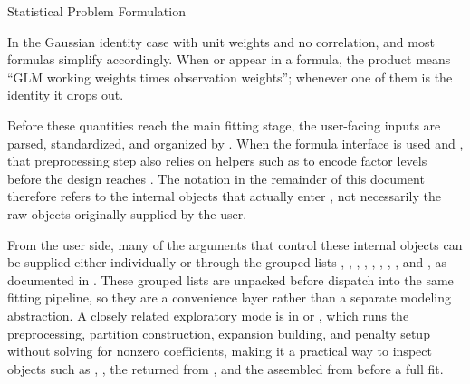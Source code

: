 \begin{Section}{Statistical Problem Formulation}
\begin{itemize}
\end{itemize}


In the Gaussian identity case with unit weights and no correlation,
and most formulas simplify accordingly. When  or
 appear in a formula, the product 
means ``GLM working weights times observation weights''; whenever one of
them is the identity it drops out.

Before these quantities reach the main fitting stage, the user-facing inputs
are parsed, standardized, and organized by . When
the formula interface is used and , that
preprocessing step also relies on helpers such as 
to encode factor levels before the design reaches .
The notation in the remainder of this document therefore refers to the internal
objects that actually enter , not necessarily the raw
objects originally supplied by the user.

From the user side, many of the arguments that control these internal objects
can be supplied either individually or through the grouped lists
, , ,
, , ,
, , and , as
documented in . These grouped lists are unpacked before
dispatch into the same fitting pipeline, so they are a convenience layer
rather than a separate modeling abstraction. A closely related exploratory
mode is  in  or
, which runs the preprocessing, partition
construction, expansion building, and penalty setup without solving for
nonzero coefficients, making it a practical way to inspect objects such as
, , the returned  from
, and the assembled  from
 before a full fit.
\end{Section}
%
